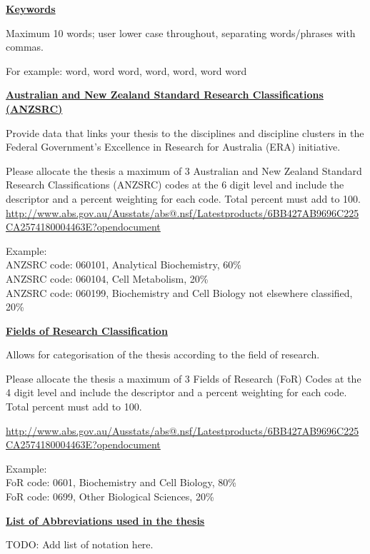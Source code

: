 \newpage

{\bf \underline{Keywords}}

Maximum 10 words; user lower case throughout, separating words/phrases with
commas.

For example: word, word word, word, word, word word

{\bf \underline{Australian and New Zealand Standard Research Classifications
(ANZSRC)}}

Provide data that links your thesis to the disciplines and discipline clusters
in the Federal Government’s Excellence in Research for Australia (ERA)
initiative.

Please allocate the thesis a maximum of 3 Australian and New Zealand Standard
Research Classifications (ANZSRC) codes at the 6 digit level and include the
descriptor and a percent weighting for each code. Total percent must add to
100.
\url{http://www.abs.gov.au/Ausstats/abs@.nsf/Latestproducts/6BB427AB9696C225CA2574180004463E?opendocument}

Example: \\
ANZSRC code: 060101, Analytical Biochemistry, 60\% \\
ANZSRC code: 060104, Cell Metabolism, 20\% \\
ANZSRC code: 060199, Biochemistry and Cell Biology not elsewhere classified, 20\%

{\bf \underline{Fields of Research Classification}}

Allows for categorisation of the thesis according to the field of research.

Please allocate the thesis a maximum of 3 Fields of Research (FoR) Codes at the
4 digit level and include the descriptor and a percent weighting for each code.
Total percent must add to 100.

\url{http://www.abs.gov.au/Ausstats/abs@.nsf/Latestproducts/6BB427AB9696C225CA2574180004463E?opendocument}

Example: \\
FoR code: 0601, Biochemistry and Cell Biology, 80\% \\
FoR code: 0699, Other Biological Sciences, 20\%

\tableofcontents




\newpage

{\bf \underline{List of Abbreviations used in the thesis}}

TODO: Add list of notation here.
